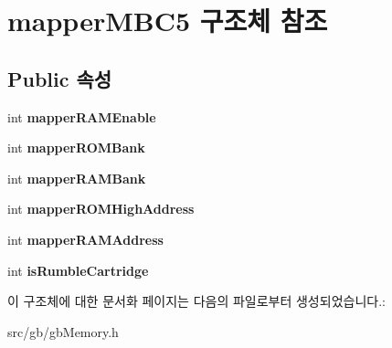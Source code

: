 \hypertarget{structmapper_m_b_c5}{}\section{mapper\+M\+B\+C5 구조체 참조}
\label{structmapper_m_b_c5}
\subsection*{Public 속성}
\begin{DoxyCompactItemize}
\item 
\mbox{\label{structmapper_m_b_c5_a719277ef6f243d6270d394eb4f6701e7}} 
int {\bfseries mapper\+R\+A\+M\+Enable}
\item 
\mbox{\label{structmapper_m_b_c5_a6c1503dde2a71a9cca438b331fc2f96a}} 
int {\bfseries mapper\+R\+O\+M\+Bank}
\item 
\mbox{\label{structmapper_m_b_c5_a44f10df4538a1a90080cf625203ddfe9}} 
int {\bfseries mapper\+R\+A\+M\+Bank}
\item 
\mbox{\label{structmapper_m_b_c5_ac439fc9836d18dece2da122cca4cb0be}} 
int {\bfseries mapper\+R\+O\+M\+High\+Address}
\item 
\mbox{\label{structmapper_m_b_c5_ac0566cbc10191dba164d756ed2750ef9}} 
int {\bfseries mapper\+R\+A\+M\+Address}
\item 
\mbox{\label{structmapper_m_b_c5_af30d38450c27d153ee0cf288a2c3a9cc}} 
int {\bfseries is\+Rumble\+Cartridge}
\end{DoxyCompactItemize}


이 구조체에 대한 문서화 페이지는 다음의 파일로부터 생성되었습니다.\+:\begin{DoxyCompactItemize}
\item 
src/gb/gb\+Memory.\+h\end{DoxyCompactItemize}
